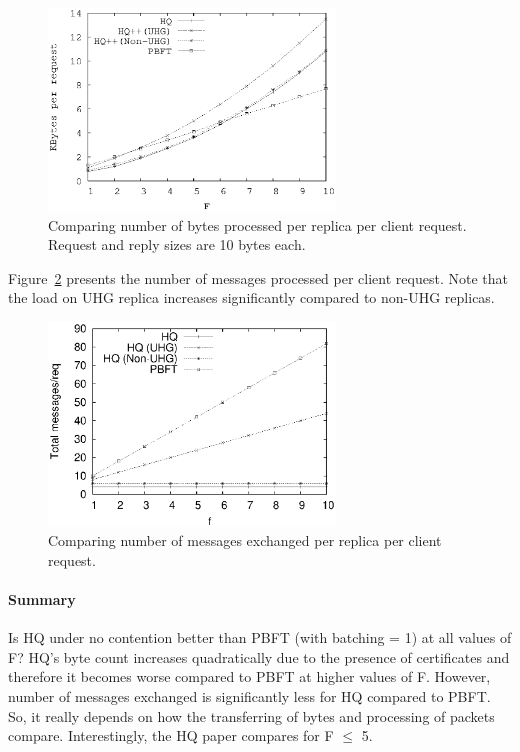 \documentclass[twocolumn,10pt]{article}
\begin{document}
\begin{figure}
\centering
\includegraphics[width=3.0in]{analysis/compare-bytes-10-byte-req.ps}
\caption{Comparing number of bytes processed per replica per client request. Request and reply
sizes are 10 bytes each.}
\label{fig:compare_bytes_10}
\end{figure}
\fi

Figure~\ref{fig:compare_msg_counts} presents the number of messages processed per client 
request. Note that the load on UHG replica increases significantly compared to non-UHG replicas.


\begin{figure}
\centering
\includegraphics[width=3.0in]{analysis/message-counts.ps}
\caption{Comparing number of messages exchanged per replica per client request.}
\label{fig:compare_msg_counts}
\end{figure}
\fi


\paragraph{Summary} Is HQ under no contention better than PBFT (with batching = 1) at all
values of F? HQ's byte count increases quadratically due to the presence of certificates and 
therefore it becomes worse compared to PBFT at higher values of F. However, number of messages
exchanged is significantly less for HQ compared to PBFT. So, it really depends on how the 
transferring of bytes and processing of packets compare.
Interestingly, the HQ paper
compares for F $\le$ 5. 
\end{document}
